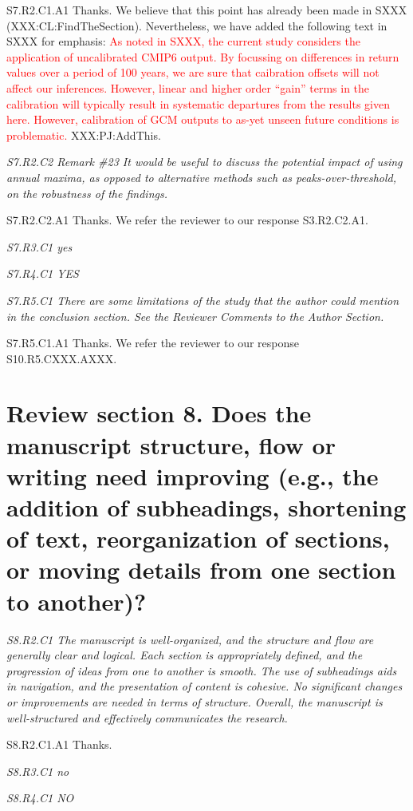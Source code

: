\documentclass[a4paper,10pt]{article}
\newcommand{\ed}[1]{\textcolor{red}{#1}}
\begin{document}
	S7.R2.C1.A1 Thanks. We believe that this point has already been made in SXXX (XXX:CL:FindTheSection). Nevertheless, we have added the following text in SXXX for emphasis: \ed{As noted in SXXX, the current study considers the application of uncalibrated CMIP6 output. By focussing on differences in return values over a period of 100 years, we are sure that caibration offsets will not affect our inferences. However, linear and higher order ``gain'' terms in the calibration will typically result in systematic departures from the results given here. However, calibration of GCM outputs to as-yet unseen future conditions is problematic.} XXX:PJ:AddThis.

	\emph{S7.R2.C2 Remark \#23 It would be useful to discuss the potential impact of using annual maxima, as opposed to alternative methods such as peaks-over-threshold, on the robustness of the findings.}

	S7.R2.C2.A1 Thanks. We refer the reviewer to our response S3.R2.C2.A1.

	\emph{S7.R3.C1 yes}

	\emph{S7.R4.C1 YES}

	\emph{S7.R5.C1 There are some limitations of the study that the author could mention in the conclusion section. See the Reviewer Comments to the Author Section.}

	S7.R5.C1.A1 Thanks. We refer the reviewer to our response S10.R5.CXXX.AXXX.

	\section*{Review section 8. Does the manuscript structure, flow or writing need improving (e.g., the addition of subheadings, shortening of text, reorganization of sections, or moving details from one section to another)?}

	\emph{S8.R2.C1 The manuscript is well-organized, and the structure and flow are generally clear and logical. Each section is appropriately defined, and the progression of ideas from one to another is smooth. The use of subheadings aids in navigation, and the presentation of content is cohesive. No significant changes or improvements are needed in terms of structure. Overall, the manuscript is well-structured and effectively communicates the research.}
	
	S8.R2.C1.A1 Thanks.

	\emph{S8.R3.C1 no}

	\emph{S8.R4.C1 NO}
\end{document}
